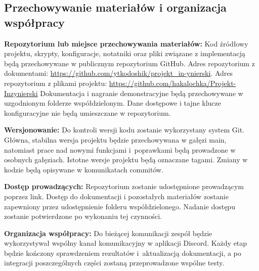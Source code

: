 \documentclass[11pt,a4paper,oneside]{article}
\newif\ifpodpowiedzi
\newcommand{\podpowiedz}[1]{\ifpodpowiedzi\par\begingroup\small\color{hintcolor}\textit{Wskazówka: #1}\par\endgroup\fi}
\begin{document}
\newpage
\subsection{Przechowywanie materiałów i organizacja współpracy}

\podpowiedz{W projekcie programistycznym podaj adres repozytorium kodu. W projekcie o innym charakterze, np. animacji 3D, wskaż uzgodnione z prowadzącymi miejsce przechowywania plików źródłowych, zasobów i rezultatów. Opisz sposób oznaczania kolejnych wersji i zapewnij dostęp obojgu prowadzącym.}

\textbf{Repozytorium lub miejsce przechowywania materiałów:}
{Kod źródłowy projektu, skrypty, konfiguracje, notatniki oraz pliki związane z implementacją będą przechowywane w publicznym repozytorium GitHub. Adres repozytorium z dokumentami: \url{https://github.com/ytkodoshik/projekt_in-ynierski}. Adres repozytorium z plikami projektu: \url{https://github.com/hakalochka/Projekt-Inzynierski} Dokumentacja i nagranie demonstracyjne będą przechowywane w uzgodnionym folderze współdzielonym. Dane dostępowe i tajne klucze konfiguracyjne nie będą umieszczane w repozytorium.}\par

\textbf{Wersjonowanie:}
{Do kontroli wersji kodu zostanie wykorzystany system Git. Główna, stabilna wersja projektu będzie przechowywana w gałęzi main, natomiast prace nad nowymi funkcjami i~poprawkami będą prowadzone w osobnych gałęziach. Istotne wersje projektu będą oznaczane tagami. Zmiany w kodzie będą opisywane w komunikatach commitów.}\par

\textbf{Dostęp prowadzących:}
{Repozytorium zostanie udostępnione prowadzącym poprzez link. Dostęp do dokumentacji i pozostałych materiałów zostanie zapewniony przez udostępnienie folderu współdzielonego. Nadanie dostępu zostanie potwierdzone po wykonaniu tej czynności.}\par

\textbf{Organizacja współpracy:}
{Do bieżącej komunikacji zespół będzie wykorzystywał wspólny kanał komunikacyjny w aplikacji Discord. Każdy etap będzie kończony sprawdzeniem rezultatów i~aktualizacją dokumentacji, a po integracji poszczególnych części zostaną przeprowadzone wspólne testy.}
\end{document}
